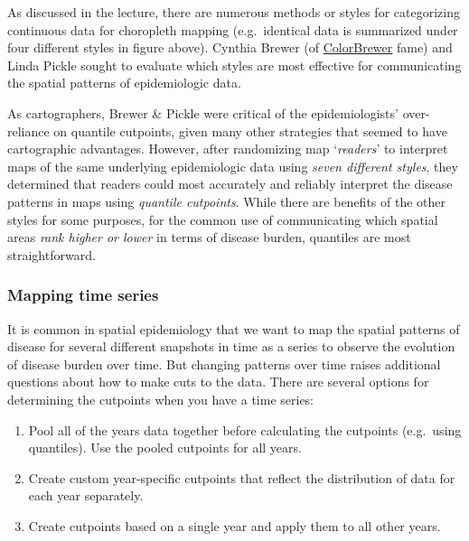 \documentclass[
]{book}
\providecommand{\tightlist}{%
  \setlength{\itemsep}{0pt}\setlength{\parskip}{0pt}}
\begin{document}
As discussed in the lecture, there are numerous methods or styles for categorizing continuous data for choropleth mapping (e.g.~identical data is summarized under four different styles in figure above). Cynthia Brewer (of \href{https://colorbrewer2.org/\#type=sequential\&scheme=BuGn\&n=3}{ColorBrewer} fame) and Linda Pickle \citeyearpar{brewer_evaluation_2002} sought to evaluate which styles are most effective for communicating the spatial patterns of epidemiologic data.

As cartographers, Brewer \& Pickle were critical of the epidemiologists' over-reliance on quantile cutpoints, given many other strategies that seemed to have cartographic advantages. However, after randomizing map `\emph{readers}' to interpret maps of the same underlying epidemiologic data using \emph{seven different styles}, they determined that readers could most accurately and reliably interpret the disease patterns in maps using \emph{quantile cutpoints}. While there are benefits of the other styles for some purposes, for the common use of communicating which spatial areas \emph{rank higher or lower} in terms of disease burden, quantiles are most straightforward.

\hypertarget{mapping-time-series}{%
\subsubsection{Mapping time series}\label{mapping-time-series}}

It is common in spatial epidemiology that we want to map the spatial patterns of disease for several different snapshots in time as a series to observe the evolution of disease burden over time. But changing patterns over time raises additional questions about how to make cuts to the data. There are several options for determining the cutpoints when you have a time series:

\begin{enumerate}
\def\labelenumi{\arabic{enumi}.}
\tightlist
\item
  Pool all of the years data together before calculating the cutpoints (e.g.~using quantiles). Use the pooled cutpoints for all years.
\item
  Create custom year-specific cutpoints that reflect the distribution of data for each year separately.
\item
  Create cutpoints based on a single year and apply them to all other years.
\end{enumerate}
\end{document}
